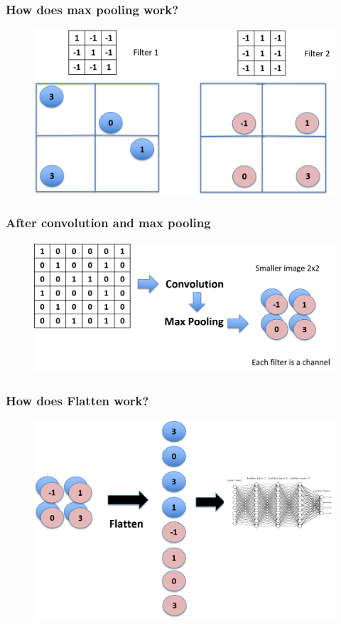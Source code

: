 \documentclass{beamer}
\begin{document}
\begin{frame}
	\frametitle{How does max pooling work?}
	\begin{figure}
	\includegraphics[width=0.8\linewidth]{Picture8}
	\end{figure}
\end{frame}

\begin{frame}
	\frametitle{After convolution and max pooling}
	\begin{figure}
	\includegraphics[width=\linewidth]{Picture9}
	\end{figure}
\end{frame}

\begin{frame}
	\frametitle{How does Flatten work?}
	\begin{figure}
	\includegraphics[width=\linewidth]{Picture10}
	\end{figure}
\end{frame}
\end{document}
